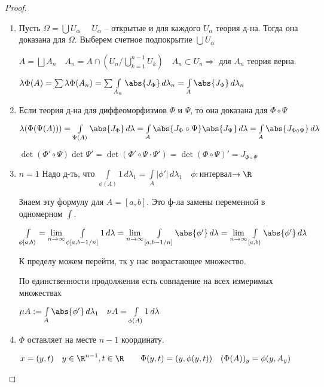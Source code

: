 \begin{proof}\thmslashn
	
	\begin{enumerate}[Шаг 1.]
		\item Пусть $\Omega = \bigcup U_\alpha \quad$ $U_\alpha$ -- открытые и  для каждого $U_\alpha$ теория д-на. Тогда она доказана для $\Omega$. Выберем счетное подпокрытие $\bigcup U_\alpha$
		
		$A = \bigsqcup A_n \quad A_n = A \cap (U_n / \bigcup\limits_{k=1}^{n-1} U_k) \quad A_n \subset U_n \Rightarrow$ для $A_n$ теория верна.
		
		$\lambda \Phi(A) = \sum \lambda \Phi(A_n) = \sum \int\limits_{A_n} \abs{J_\Phi} \,d\lambda_n = \int\limits_{A} \abs{J_\Phi} \, d\lambda_n$
		
		
		\item Если теория д-на для диффеоморфизмов $\Phi$ и $\Psi$, то она доказана для $\Phi \circ \Psi$
		
		$\lambda(\Phi(\Psi(A))) = \int\limits_{\Psi(A)} \abs{J_\Phi }\,d\lambda = \int\limits_{A} \abs{J_{\Phi} \circ \Psi}\abs{J_\Psi}\,d\lambda = \int\limits_{A} \abs{J_{\Phi \circ \Psi}}\,d\lambda$
		
		$\det (\Phi' \circ \Psi) \det \Psi' = \det (\Phi' \circ \Psi \cdot \Psi') = \det (\Phi \circ \Psi)' = J_{\Phi \circ \Psi}$
		
		\item $n = 1$ Надо д-ть, что $\int\limits_{\phi(A)} 1 \, d\lambda_1 = \int\limits_{A}|\phi'|\,d\lambda_1 \quad \phi:$интервал$\to \R$
		
		Знаем эту формулу для $A = [a,b]$. Это ф-ла замены переменной в одномерном $\int$.
		
		$\int\limits_{\phi[a, b)} = \lim\limits_{n \to \infty}\int\limits_{\phi[a, b-1/n]}1 \,d\lambda = \lim\limits_{n \to \infty}\int\limits_{[a, b-1/n]}\abs{\phi'} \,d\lambda = \lim\limits_{n \to \infty}\int\limits_{[a, b)}\abs{\phi'} \,d\lambda$
		
		К пределу можем перейти, тк у нас возрастающее множество.
		
		По единственности продолжения есть совпадение на всех измеримых множествах 
		
		$\mu A := \int\limits_{A} \abs{\phi'}\,d\lambda_1 \quad \nu A = \int\limits_{\phi(A)}1\,d\lambda$
		
		\item $\Phi$ оставляет на месте $n-1$ координату. 
		
		$x = (y, t)\quad y\in \R^{n-1}, t\in \R\quad\quad \Phi(y, t) = (y, \phi(y, t)) \quad (\Phi(A))_y = \phi(y, A_y)$
		

\end{enumerate}
\end{proof}
